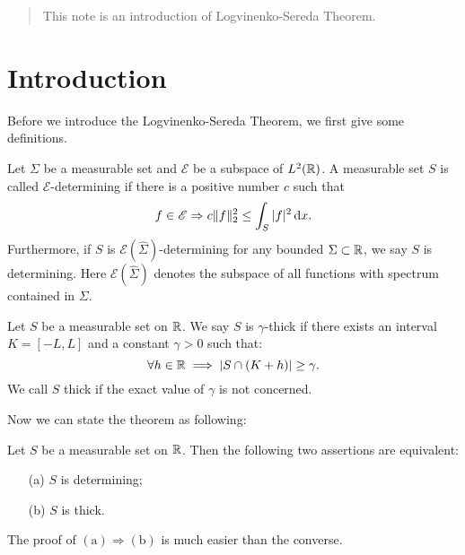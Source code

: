 \begin{abstract}
	This note is an introduction of Logvinenko-Sereda Theorem. 
\end{abstract}
\tableofcontents
\section{Introduction}
Before we introduce the Logvinenko-Sereda Theorem, we first give some definitions.

\begin{definition}
	 Let $\Sigma$ be a measurable set and $\mathscr{E}$ be a subspace of $L^2(\mathbb{R})$. A measurable set $S$ is called $\mathscr{E}$-determining if there is a positive number $c$ such that 
	 \begin{equation}\label{eqn:def}
	 	f \in \mathscr{E} \Rightarrow c\|f\|_2^2\le \int_S|f|^2\,\mathrm{d} x.
	 \end{equation}
	 Furthermore, if $S$ is $\mathscr{E}(\widehat{\Sigma})$-determining for any bounded $\Sigma \subset \mathbb{R}$, we say $S$ is determining. Here $\mathscr{E}(\widehat{\Sigma})$ denotes the subspace of all functions with spectrum contained in $\Sigma$.
\end{definition}


\begin{definition}\label{def:thick}
	Let $S$ be a measurable set on $\mathbb{R}$. We say $S$ is $\gamma$-thick if there exists an interval $K=[-L,L]$ and a constant $\gamma>0$ such that:
	\[
	\forall h\in \mathbb{R} \implies |S\cap (K+h)|\ge \gamma. 
	\] 
	We call $S$ thick if the exact value of  $\gamma$ is not concerned.
\end{definition}

Now we can state the theorem as following:
\begin{theorem} \label{thm:main}
	Let $S$ be a measurable set on $\mathbb{R}$. Then the following two assertions are equivalent:
	\begin{itemize}
		\item[(a)] $S$ is determining;
		\item[(b)] $S$ is thick.
	\end{itemize}
\end{theorem}

The proof of $(\mathrm{a})\Rightarrow (\mathrm{b})$ is much easier than the converse.

